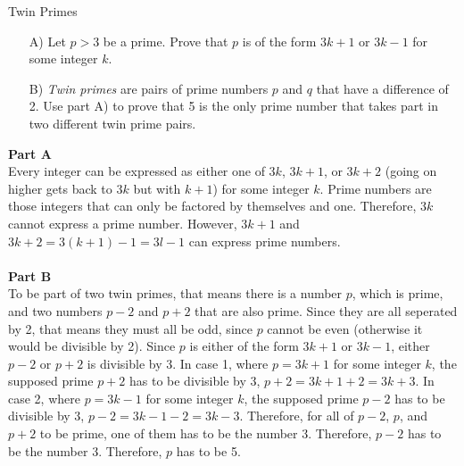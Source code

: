 \begin{homeworkProblem}{Twin Primes}
    \begin{enumerate}
        \item[A)] Let $p > 3$ be a prime. Prove that $p$ is of the form $3k+1$ or $3k-1$ for some integer $k$.
        \item[B)] \textit{Twin primes} are pairs of prime numbers $p$ and $q$ that have a difference of 2. Use part A) to prove that 5 is the only prime number that takes part in two different twin prime pairs. 
    \end{enumerate}

    \textbf{Part A} \\
    Every integer can be expressed as either one of $3k$, $3k+1$, or $3k+2$ (going on higher gets back to $3k$ but with $k+1$) for some integer $k$. Prime numbers are those integers that can only be factored by themselves and one. Therefore, $3k$ cannot express a prime number. However, $3k+1$ and $3k+2=3(k+1)-1=3l-1$ can express prime numbers. 
    \\ \\
    \textbf{Part B} \\
    To be part of two twin primes, that means there is a number $p$, which is prime, and two numbers $p-2$ and $p+2$ that are also prime. Since they are all seperated by 2, that means they must all be odd, since $p$ cannot be even (otherwise it would be divisible by 2). Since $p$ is either of the form $3k+1$ or $3k-1$, either $p-2$ or $p+2$ is divisible by 3. In case 1, where $p = 3k+1$ for some integer $k$, the supposed prime $p+2$ has to be divisible by 3, $p+2=3k+1+2= 3k+3$. In case 2, where $p=3k-1$ for some integer $k$, the supposed prime $p-2$ has to be divisible by 3, $p-2=3k-1-2=3k-3$. Therefore, for all of $p-2$, $p$, and $p+2$ to be prime, one of them has to be the number 3. Therefore, $p-2$ has to be the number 3. Therefore, $p$ has to be 5. 
    
\end{homeworkProblem}